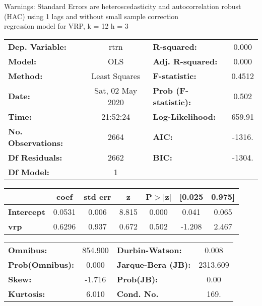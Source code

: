 Warnings: \newline
 [1] Standard Errors are heteroscedasticity and autocorrelation robust (HAC) using 1 lags and without small sample correction\\ 

regression model for VRP, k = 12 h = 3\begin{center}
\begin{tabular}{lclc}
\toprule
\textbf{Dep. Variable:}    &       rtrn       & \textbf{  R-squared:         } &     0.000   \\
\textbf{Model:}            &       OLS        & \textbf{  Adj. R-squared:    } &     0.000   \\
\textbf{Method:}           &  Least Squares   & \textbf{  F-statistic:       } &    0.4512   \\
\textbf{Date:}             & Sat, 02 May 2020 & \textbf{  Prob (F-statistic):} &    0.502    \\
\textbf{Time:}             &     21:52:24     & \textbf{  Log-Likelihood:    } &    659.91   \\
\textbf{No. Observations:} &        2664      & \textbf{  AIC:               } &    -1316.   \\
\textbf{Df Residuals:}     &        2662      & \textbf{  BIC:               } &    -1304.   \\
\textbf{Df Model:}         &           1      & \textbf{                     } &             \\
\bottomrule
\end{tabular}
\begin{tabular}{lcccccc}
                   & \textbf{coef} & \textbf{std err} & \textbf{z} & \textbf{P$> |$z$|$} & \textbf{[0.025} & \textbf{0.975]}  \\
\midrule
\textbf{Intercept} &       0.0531  &        0.006     &     8.815  &         0.000        &        0.041    &        0.065     \\
\textbf{vrp}       &       0.6296  &        0.937     &     0.672  &         0.502        &       -1.208    &        2.467     \\
\bottomrule
\end{tabular}
\begin{tabular}{lclc}
\textbf{Omnibus:}       & 854.900 & \textbf{  Durbin-Watson:     } &    0.008  \\
\textbf{Prob(Omnibus):} &   0.000 & \textbf{  Jarque-Bera (JB):  } & 2313.609  \\
\textbf{Skew:}          &  -1.716 & \textbf{  Prob(JB):          } &     0.00  \\
\textbf{Kurtosis:}      &   6.010 & \textbf{  Cond. No.          } &     169.  \\
\bottomrule
\end{tabular}
\end{center}

